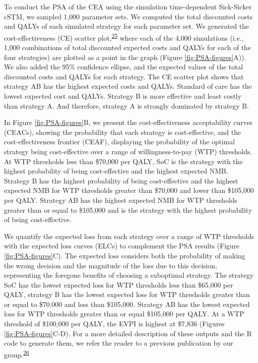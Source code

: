 \documentclass[
]{article}
\begin{document}
To conduct the PSA of the CEA using the simulation time-dependent Sick-Sicker cSTM, we sampled 1,000 parameter sets. We computed the total discounted costs and QALYs of each simulated strategy for each parameter set. We generated the cost-effectiveness (CE) scatter plot,\textsuperscript{\protect\hyperlink{ref-Briggs2002}{25}} where each of the 4,000 simulations (i.e., 1,000 combinations of total discounted expected costs and QALYs for each of the four strategies) are plotted as a point in the graph (Figure \ref{fig:PSA-figures}A)). We also added the 95\% confidence ellipse, and the expected values of the total discounted costs and QALYs for each strategy. The CE scatter plot shows that strategy AB has the highest expected costs and QALYs. Standard of care has the lowest expected cost and QALYs. Strategy B is more effective and least costly than strategy A. And therefore, strategy A is strongly dominated by strategy B.

In Figure \ref{fig:PSA-figures}B, we present the cost-effectiveness acceptability curves (CEACs), showing the probability that each strategy is cost-effective, and the cost-effectiveness frontier (CEAF), displaying the probability of the optimal strategy being cost-effective over a range of willingness-to-pay (WTP) thresholds. At WTP thresholds less than \$70,000 per QALY, SoC is the strategy with the highest probability of being cost-effective and the highest expected NMB. Strategy B has the highest probability of being cost-effective and the highest expected NMB for WTP thresholds greater than \$70,000 and lower than \$105,000 per QALY. Strategy AB has the highest expected NMB for WTP thresholds greater than or equal to \$105,000 and is the strategy with the highest probability of being cost-effective.

We quantify the expected loss from each strategy over a range of WTP thresholds with the expected loss curves (ELCs) to complement the PSA results (Figure \ref{fig:PSA-figures}C). The expected loss considers both the probability of making the wrong decision and the magnitude of the loss due to this decision, representing the foregone benefits of choosing a suboptimal strategy. The strategy SoC has the lowest expected loss for WTP thresholds less than \$65,000 per QALY, strategy B has the lowest expected loss for WTP thresholds greater than or equal to \$70,000 and less than \$105,000. Strategy AB has the lowest expected loss for WTP thresholds greater than or equal \$105,000 per QALY. At a WTP threshold of \$100,000 per QALY, the EVPI is highest at \$7,836 (Figures \ref{fig:PSA-figures}C-D). For a more detailed description of these outputs and the R code to generate them, we refer the reader to a previous publication by our group.\textsuperscript{\protect\hyperlink{ref-Alarid-Escudero2019}{26}}
\end{document}
